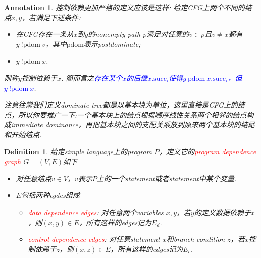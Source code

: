 \documentclass{article}
\newtheorem{definition}[theorem]{Definition}
\newtheorem{annotation}[theorem]{Annotation}
\newcommand{\redt}[1]{\textcolor{red}{#1}}
\newcommand{\bluet}[1]{\textcolor{blue}{#1}}
\begin{document}
\begin{annotation}\label{the-def-of-control-dependence}
\rm 控制依赖更加严格的定义应该是这样: 给定CFG上两个不同的结点$x,y$，若满足下述条件\cite{cdg}: 
\begin{itemize}
	\item 在CFG存在一条从$x$到$y$的nonempty path $p$满足对任意的$v \in p$且$v \neq x$都有$y~\text{!pdom}~v$，其中$\text{pdom}$表示postdominate;  
	\item $y~\text{!pdom}~x$. 
\end{itemize}
则称$y$控制依赖于$x$. 简而言之\bluet{存在某个$x$的后继$x.{\text{succ}_i}$使得$y~\text{pdom}~x.{\text{succ}_i}$，但$y~\text{!pdom}~x$}. 

注意往常我们定义dominate tree都是以基本块为单位，这里直接是CFG上的结点，所以你要推广一下:一个基本块上的结点根据顺序线性关系两个相邻的结点构成immediate dominance，再把基本块之间的支配关系放到原来两个基本块的结尾和开始结点.   
\end{annotation}



\begin{definition}
\rm 给定simple language上的program $P$，定义它的\redt{program dependence graph} $G = (V,E)$如下
\begin{itemize}
	\item 对任意结点$v \in V$，$v$表示$P$上的一个statement或者statement中某个变量. 
	\item $E$包括两种egdes组成
		\begin{itemize}
			\item \redt{data dependence edges}: 对任意两个variables $x,y$，若$y$的定义数据依赖于$x$，则$(x,y) \in E$，所有这样的edges记为$E_d$. 
			\item \redt{control dependence edges}: 对任意statement $x$和branch condition $z$，若$x$控制依赖于$z$，则$(x,z) \in E$，所有这样的edges记为$E_c$. 		
		\end{itemize}		 
\end{itemize}
\end{definition}
\end{document}
